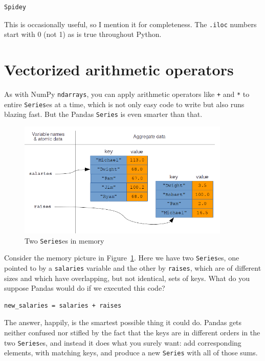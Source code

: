 \begin{Verbatim}[fontsize=\small,samepage=true,frame=leftline,framesep=5mm,framerule=1mm]
Spidey
\end{Verbatim}

This is occasionally useful, so I mention it for completeness. The
\texttt{.iloc} numbers start with 0 (not 1) as is true throughout Python.

\section{Vectorized arithmetic operators}

As with NumPy \texttt{ndarrays}, you can apply arithmetic operators like
\texttt{+} and \texttt{*} to entire \texttt{Series}es at a time, which is not
only easy code to write but also runs blazing fast. But the Pandas
\texttt{Series} is even smarter than that.

\begin{figure}[ht]
\centering
\includegraphics[width=0.9\textwidth]{vectorizedPandas.png}
\caption{Two \texttt{Series}es in memory}
\label{fig:vectorizedPandas}
\end{figure}

Consider the memory picture in Figure~\ref{fig:vectorizedPandas}. Here we have
two \texttt{Series}es, one pointed to by a \texttt{salaries} variable and the
other by \texttt{raises}, which are of different sizes and which have
overlapping, but not identical, sets of keys. What do you suppose Pandas would
do if we executed this code?

\begin{Verbatim}[fontsize=\small,samepage=true,frame=single,framesep=3mm]
new_salaries = salaries + raises
\end{Verbatim}

The answer, happily, is the smartest possible thing it could do. Pandas gets
neither confused nor stifled by the fact that the keys are in different orders
in the two \texttt{Series}es, and instead it does what you surely want:
add corresponding elements, with matching keys, and produce a new
\texttt{Series} with all of those sums.

